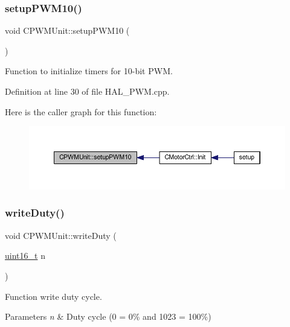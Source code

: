 \subsubsection{\texorpdfstring{setup\+P\+W\+M10()}{setupPWM10()}}
{\footnotesize\ttfamily void C\+P\+W\+M\+Unit\+::setup\+P\+W\+M10 (\begin{DoxyParamCaption}{ }\end{DoxyParamCaption})}



Function to initialize timers for 10-\/bit P\+WM. 



Definition at line 30 of file H\+A\+L\+\_\+\+P\+W\+M.\+cpp.

Here is the caller graph for this function\+:
\nopagebreak
\begin{figure}[H]
\begin{center}
\leavevmode
\includegraphics[width=350pt]{class_c_p_w_m_unit_aa36627883e91d3dec4a76fe187588071_icgraph}
\end{center}
\end{figure}
\mbox{\label{class_c_p_w_m_unit_a60f8be5eabf779f57e6392a0432bf7f2}} 
\subsubsection{\texorpdfstring{write\+Duty()}{writeDuty()}}
{\footnotesize\ttfamily void C\+P\+W\+M\+Unit\+::write\+Duty (\begin{DoxyParamCaption}\item[{\mbox{\hyperlink{_a_d_a_s___types_8h_a1f1825b69244eb3ad2c7165ddc99c956}{uint16\+\_\+t}}}]{n }\end{DoxyParamCaption})}



Function write duty cycle. 


\begin{DoxyParams}{Parameters}
{\em n} & Duty cycle (0 = 0\% and 1023 = 100\%) \\
\hline
\end{DoxyParams}


